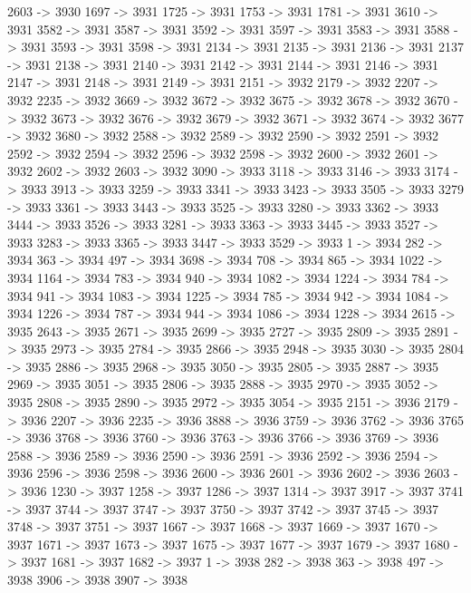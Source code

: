 {	2603 -> 3930
	1697 -> 3931
	1725 -> 3931
	1753 -> 3931
	1781 -> 3931
	3610 -> 3931
	3582 -> 3931
	3587 -> 3931
	3592 -> 3931
	3597 -> 3931
	3583 -> 3931
	3588 -> 3931
	3593 -> 3931
	3598 -> 3931
	2134 -> 3931
	2135 -> 3931
	2136 -> 3931
	2137 -> 3931
	2138 -> 3931
	2140 -> 3931
	2142 -> 3931
	2144 -> 3931
	2146 -> 3931
	2147 -> 3931
	2148 -> 3931
	2149 -> 3931
	2151 -> 3932
	2179 -> 3932
	2207 -> 3932
	2235 -> 3932
	3669 -> 3932
	3672 -> 3932
	3675 -> 3932
	3678 -> 3932
	3670 -> 3932
	3673 -> 3932
	3676 -> 3932
	3679 -> 3932
	3671 -> 3932
	3674 -> 3932
	3677 -> 3932
	3680 -> 3932
	2588 -> 3932
	2589 -> 3932
	2590 -> 3932
	2591 -> 3932
	2592 -> 3932
	2594 -> 3932
	2596 -> 3932
	2598 -> 3932
	2600 -> 3932
	2601 -> 3932
	2602 -> 3932
	2603 -> 3932
	3090 -> 3933
	3118 -> 3933
	3146 -> 3933
	3174 -> 3933
	3913 -> 3933
	3259 -> 3933
	3341 -> 3933
	3423 -> 3933
	3505 -> 3933
	3279 -> 3933
	3361 -> 3933
	3443 -> 3933
	3525 -> 3933
	3280 -> 3933
	3362 -> 3933
	3444 -> 3933
	3526 -> 3933
	3281 -> 3933
	3363 -> 3933
	3445 -> 3933
	3527 -> 3933
	3283 -> 3933
	3365 -> 3933
	3447 -> 3933
	3529 -> 3933
	1 -> 3934
	282 -> 3934
	363 -> 3934
	497 -> 3934
	3698 -> 3934
	708 -> 3934
	865 -> 3934
	1022 -> 3934
	1164 -> 3934
	783 -> 3934
	940 -> 3934
	1082 -> 3934
	1224 -> 3934
	784 -> 3934
	941 -> 3934
	1083 -> 3934
	1225 -> 3934
	785 -> 3934
	942 -> 3934
	1084 -> 3934
	1226 -> 3934
	787 -> 3934
	944 -> 3934
	1086 -> 3934
	1228 -> 3934
	2615 -> 3935
	2643 -> 3935
	2671 -> 3935
	2699 -> 3935
	2727 -> 3935
	2809 -> 3935
	2891 -> 3935
	2973 -> 3935
	2784 -> 3935
	2866 -> 3935
	2948 -> 3935
	3030 -> 3935
	2804 -> 3935
	2886 -> 3935
	2968 -> 3935
	3050 -> 3935
	2805 -> 3935
	2887 -> 3935
	2969 -> 3935
	3051 -> 3935
	2806 -> 3935
	2888 -> 3935
	2970 -> 3935
	3052 -> 3935
	2808 -> 3935
	2890 -> 3935
	2972 -> 3935
	3054 -> 3935
	2151 -> 3936
	2179 -> 3936
	2207 -> 3936
	2235 -> 3936
	3888 -> 3936
	3759 -> 3936
	3762 -> 3936
	3765 -> 3936
	3768 -> 3936
	3760 -> 3936
	3763 -> 3936
	3766 -> 3936
	3769 -> 3936
	2588 -> 3936
	2589 -> 3936
	2590 -> 3936
	2591 -> 3936
	2592 -> 3936
	2594 -> 3936
	2596 -> 3936
	2598 -> 3936
	2600 -> 3936
	2601 -> 3936
	2602 -> 3936
	2603 -> 3936
	1230 -> 3937
	1258 -> 3937
	1286 -> 3937
	1314 -> 3937
	3917 -> 3937
	3741 -> 3937
	3744 -> 3937
	3747 -> 3937
	3750 -> 3937
	3742 -> 3937
	3745 -> 3937
	3748 -> 3937
	3751 -> 3937
	1667 -> 3937
	1668 -> 3937
	1669 -> 3937
	1670 -> 3937
	1671 -> 3937
	1673 -> 3937
	1675 -> 3937
	1677 -> 3937
	1679 -> 3937
	1680 -> 3937
	1681 -> 3937
	1682 -> 3937
	1 -> 3938
	282 -> 3938
	363 -> 3938
	497 -> 3938
	3906 -> 3938
	3907 -> 3938
}
